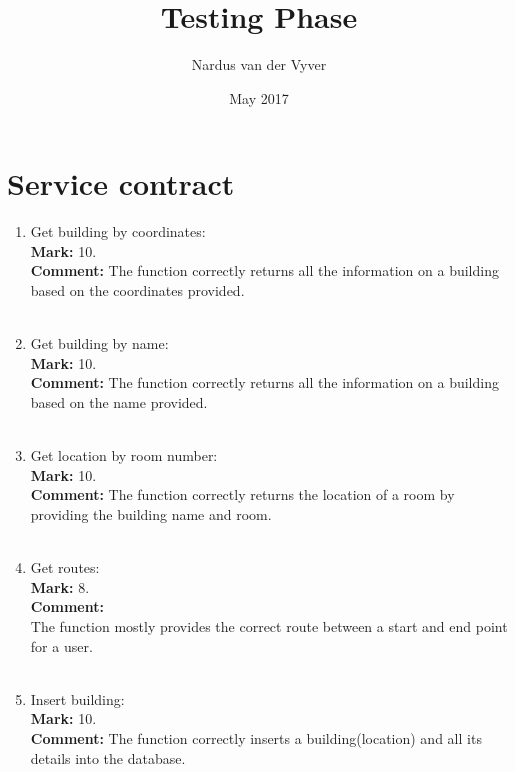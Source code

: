 \documentclass{article}
\title{Testing Phase}
\author{Nardus van der Vyver }
\date{May 2017}
\begin{document}
\maketitle

\section{Service contract}

\begin{enumerate}
    \item Get building by coordinates:\\
    \textbf{Mark: }
    10.\\
    \textbf{Comment:}
    The function correctly returns all the information on a building based on the coordinates provided.\\ \\
    
    \item Get building by name:\\
    \textbf{Mark: }
    10.\\
    \textbf{Comment:}
    The function correctly returns all the information on a building based on the name provided.\\ \\
    
    \item Get location by room number:\\
    \textbf{Mark: }
    10.\\
    \textbf{Comment:}
    The function correctly returns the location of a room by providing the building name and room.\\ \\
    
    \item Get routes:\\
    \textbf{Mark: }
    8.\\
    \textbf{Comment:}\\
    The function mostly provides the correct route between a start and end point for a user.\\ \\
    
    \item Insert building:\\
    \textbf{Mark: }
    10.\\
    \textbf{Comment:}
    The function correctly inserts a building(location) and all its details into the database.\\ \\
    

\end{enumerate}
\end{document}
